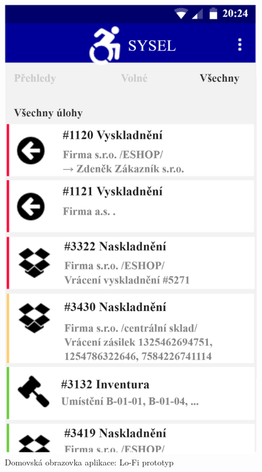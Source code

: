 \begin{figure}[]
\includegraphics[height=0.6\textheight]{../png/axure/homepage.png}
\caption{Domovská obrazovka aplikace: Lo-Fi prototyp} \label{picture:axure:homepage}
\end{figure}

